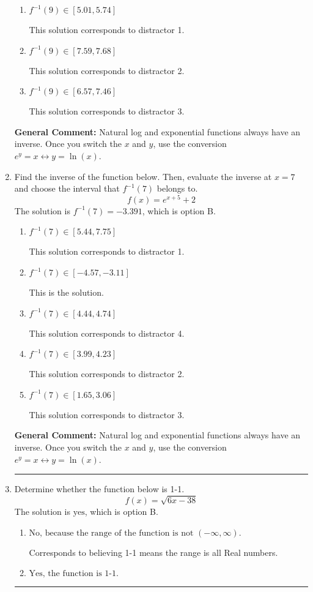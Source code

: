 \documentclass{extbook}[14pt]
\newcommand{\litem}[1]{\item #1

\rule{\textwidth}{0.4pt}}
\begin{document}
\begin{enumerate}
{\begin{enumerate}[label=\Alph*.]
 This is the solution.
\item \( f^{-1}(9) \in [5.01, 5.74] \)

 This solution corresponds to distractor 1.
\item \( f^{-1}(9) \in [7.59, 7.68] \)

 This solution corresponds to distractor 2.
\item \( f^{-1}(9) \in [6.57, 7.46] \)

 This solution corresponds to distractor 3.
\end{enumerate}

\textbf{General Comment:} Natural log and exponential functions always have an inverse. Once you switch the $x$ and $y$, use the conversion $ e^y = x \leftrightarrow y=\ln(x)$.
}
\litem{
Find the inverse of the function below. Then, evaluate the inverse at $x = 7$ and choose the interval that $f^{-1}(7)$ belongs to.
\[ f(x) = e^{x+5}+2 \]The solution is \( f^{-1}(7) = -3.391 \), which is option B.\begin{enumerate}[label=\Alph*.]
\item \( f^{-1}(7) \in [5.44, 7.75] \)

 This solution corresponds to distractor 1.
\item \( f^{-1}(7) \in [-4.57, -3.11] \)

 This is the solution.
\item \( f^{-1}(7) \in [4.44, 4.74] \)

 This solution corresponds to distractor 4.
\item \( f^{-1}(7) \in [3.99, 4.23] \)

 This solution corresponds to distractor 2.
\item \( f^{-1}(7) \in [1.65, 3.06] \)

 This solution corresponds to distractor 3.
\end{enumerate}

\textbf{General Comment:} Natural log and exponential functions always have an inverse. Once you switch the $x$ and $y$, use the conversion $ e^y = x \leftrightarrow y=\ln(x)$.
}
\litem{
Determine whether the function below is 1-1.
\[ f(x) = \sqrt{6 x - 38} \]The solution is \( \text{yes} \), which is option B.\begin{enumerate}[label=\Alph*.]
\item \( \text{No, because the range of the function is not $(-\infty, \infty)$.} \)

Corresponds to believing 1-1 means the range is all Real numbers.
\item \( \text{Yes, the function is 1-1.} \)


\end{enumerate}}
\end{enumerate}
\end{document}
